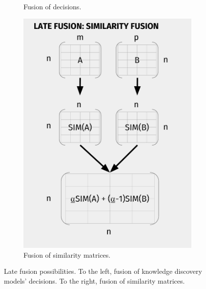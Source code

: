 \begin{figure}
\begin{subfigure}[t]{.5\textwidth}
	\caption{Fusion of decisions.}
	\label{fig:lf1}
	\end{subfigure}%
	\begin{subfigure}[t]{.5\textwidth}
	\centering
	\includegraphics[width=0.9\linewidth]{images/Chapitre3/lf2_diag.pdf}
	\caption{Fusion of similarity matrices.}
	\label{fig:lf2}	
	\end{subfigure}
	\caption{Late fusion possibilities. To the left, fusion of knowledge discovery models' decisions. To the right, fusion of similarity matrices.}
	\label{fig:lf_diag}
\end{figure}




